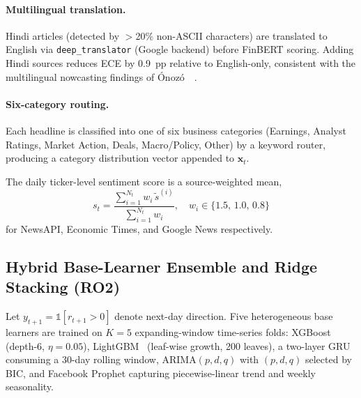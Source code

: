 \paragraph{Multilingual translation.} Hindi articles (detected by
$>$20\% non-ASCII characters) are translated to English via
\texttt{deep\_translator} (Google backend) before FinBERT scoring. Adding Hindi
sources reduces ECE by 0.9~pp relative to English-only, consistent with the
multilingual nowcasting findings of \'{O}noz\'{o}~\etal~\cite{onozo2024llms}.

\paragraph{Six-category routing.} Each headline is classified into one of six
business categories (Earnings, Analyst Ratings, Market Action, Deals,
Macro/Policy, Other) by a keyword router, producing a category distribution
vector appended to $\mathbf{x}_t$.

The daily ticker-level sentiment score is a source-weighted mean,
\begin{equation}
s_t = \frac{\sum_{i=1}^{N_t} w_i\,\tilde{s}^{(i)}}{\sum_{i=1}^{N_t} w_i},
\quad w_i \in \{1.5,\,1.0,\,0.8\}
\label{eq:sent_agg}
\end{equation}
for NewsAPI, Economic Times, and Google News respectively.

\subsection{Hybrid Base-Learner Ensemble and Ridge Stacking (RO2)}
\label{subsec:ensemble}

Let $y_{t+1} = \mathbb{1}[r_{t+1} > 0]$ denote next-day direction.
Five heterogeneous base learners are trained on $K=5$ expanding-window
time-series folds: XGBoost~\cite{chen2016xgboost} (depth-6, $\eta=0.05$),
LightGBM~\cite{ke2017lightgbm} (leaf-wise growth, 200 leaves), a two-layer
GRU~\cite{cho2014gru} consuming a 30-day rolling window, ARIMA$(p,d,q)$ with
$(p,d,q)$ selected by BIC, and Facebook Prophet capturing piecewise-linear
trend and weekly seasonality.

